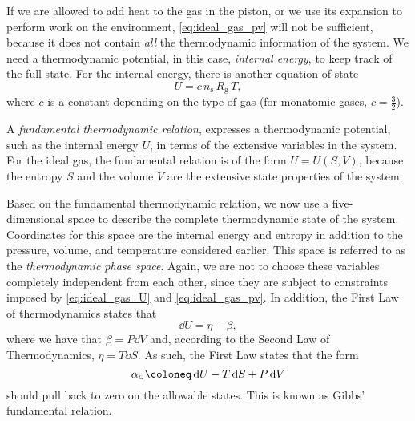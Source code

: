 If we are allowed to add heat to the gas in the piston, or we use its expansion to perform work on the environment, \cref{eq:ideal_gas_pv} will not be sufficient, because it does not contain \emph{all} the thermodynamic information of the system. We need a thermodynamic potential, in this case, \emph{internal energy}, to keep track of the full state. For the internal energy, there is another equation of state \cite{Callen1985}
\begin{equation}
    U = c\, n_\text{s}\, R_\text{g}\, T,
    \label{eq:ideal_gas_U}
\end{equation}
where $c$ is a constant depending on the type of gas (for monatomic gases, $c = \tfrac{3}{2}$).

A \emph{fundamental thermodynamic relation}, expresses a thermodynamic potential, such as the internal energy $U$, in terms of the extensive variables in the system. For the ideal gas, the fundamental relation is of the form $U = U(S, V)$, because the entropy $S$ and the volume $V$ are the extensive state properties of the system. 

Based on the fundamental thermodynamic relation, we now use a five-dimensional space to describe the complete thermodynamic state of the system. Coordinates for this space are the internal energy and entropy in addition to the pressure, volume, and temperature considered earlier. This space is referred to as the \emph{thermodynamic phase space}. Again, we are not to choose these variables completely independent from each other, since they are subject to constraints imposed by \cref{eq:ideal_gas_U} and \cref{eq:ideal_gas_pv}. In addition, the First Law of thermodynamics states that
$$ \dd{U} = \eta - \beta, $$
where we have that $ \beta = P\dd{V} $ and, according to the Second Law of Thermodynamics, $\eta = T\dd{S}$. As such, the First Law states that the form
\begin{equation} 
    \alpha_\text{\tiny G} \coloneq \dd{U} - T\dd{S} + P\dd{V}
    \label{eq:gibbs_relation}
\end{equation}
should pull back to zero on the allowable states. This is known as Gibbs' fundamental relation. 

